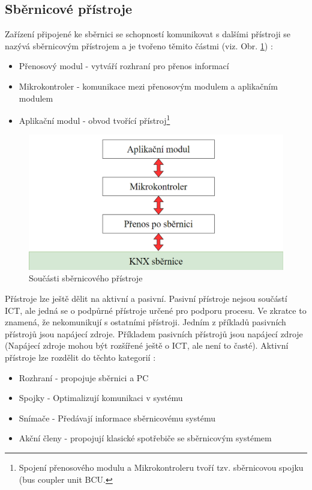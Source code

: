 \subsection{Sběrnicové přístroje}
Zařízení připojené ke sběrnici se schopností komunikovat s dalšími přístroji se nazývá sběrnicovým přístrojem a je tvořeno těmito částmi (viz. Obr. \ref{fig:Součásti sběrnicového přístroje}) \cite{KNX principles}:

\begin{itemize}
\item Přenosový modul - vytváří rozhraní pro přenos informací
\item Mikrokontroler - komunikace mezi přenosovým modulem a aplikačním modulem
\item Aplikační modul - obvod tvořící přístroj\footnote{Spojení přenosového modulu a Mikrokontroleru tvoří tzv. sběrnicovou spojku (bus coupler unit BCU.}
\end{itemize}
\begin{figure}[!h]
  \begin{center}
    \includegraphics[scale=0.7]{obrazky/sbernice.png}
  \end{center}
  \caption[Součásti sběrnicového přístroje \cite{KNX principles}] {Součásti sběrnicového přístroje \cite{KNX principles}}
  \label{fig:Součásti sběrnicového přístroje}
\end{figure}
Přístroje lze ještě dělit na aktivní a pasivní. Pasivní přístroje nejsou součástí ICT, ale jedná se o podpůrné přístroje určené pro podporu procesu. Ve zkratce to znamená, že nekomunikují s ostatními přístroji. Jedním z příkladů pasivních přístrojů jsou napájecí zdroje.  Příkladem pasivních přístrojů jsou napájecí zdroje (Napájecí zdroje mohou být rozšířené ještě o ICT, ale není to časté).  
Aktivní přístroje lze rozdělit do těchto kategorií \cite{KNX principles}:
\begin{itemize}
\item Rozhraní - propojuje sběrnici a PC
\item Spojky - Optimalizují komunikaci v systému
\item Snímače - Předávají informace sběrnicovému systému
\item Akční členy - propojují klasické spotřebiče se sběrnicovým systémem
\end{itemize}

